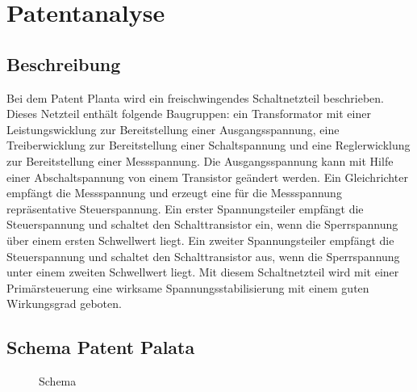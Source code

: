 \section{Patentanalyse}\label{sec:Patentanalyse}
\subsection{Beschreibung}\label{subsec:Beschreibung}
Bei dem Patent Planta wird ein freischwingendes Schaltnetzteil beschrieben. Dieses Netzteil enthält folgende Baugruppen: ein Transformator mit einer Leistungswicklung zur Bereitstellung einer Ausgangsspannung, eine Treiberwicklung zur Bereitstellung einer Schaltspannung und eine Reglerwicklung zur Bereitstellung einer Messspannung. Die Ausgangsspannung kann mit Hilfe einer Abschaltspannung von einem Transistor geändert werden. Ein Gleichrichter empfängt die Messspannung und erzeugt eine für die Messspannung repräsentative Steuerspannung. Ein erster Spannungsteiler empfängt die Steuerspannung und schaltet den Schalttransistor ein, wenn die Sperrspannung über einem ersten Schwellwert liegt. Ein zweiter Spannungsteiler empfängt die Steuerspannung und schaltet den Schalttransistor aus, wenn die Sperrspannung unter einem zweiten Schwellwert liegt. Mit diesem Schaltnetzteil wird mit einer Primärsteuerung eine wirksame Spannungsstabilisierung mit einem guten Wirkungsgrad geboten.

\subsection{Schema Patent Palata}\label{subsec:Schema}
\begin{figure}[h!]
	\centering
{}
	\caption{Schema}
	\label{fig:Schema}
\end{figure} 
\newpage
